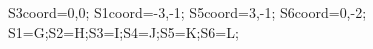 \documentclass[exercice]{thedocument}%
\begin{document}
%
    \>S3coord={0,0};%
    \>S1coord={-3,-1};%
    \>S5coord={3,-1};%
    \>S6coord={0,-2};%
    \>S1=G;\>S2=H;\>S3=I;\>S4=J;\>S5=K;\>S6=L;%
\end{document}
